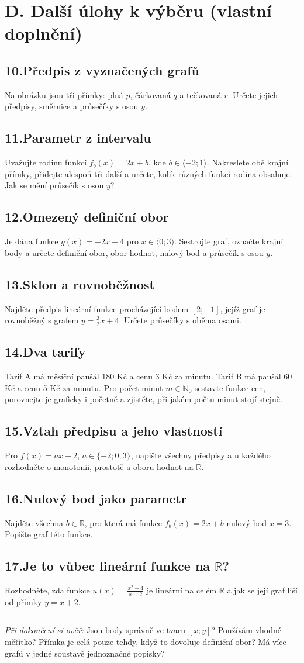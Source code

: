 \documentclass[11pt,a4paper]{article}
\newcommand{\uloha}[2]{\par\needspace{4\baselineskip}\subsection*{#1\enspace #2}}
\begin{document}
\section*{D. Další úlohy k výběru (vlastní doplnění)}
\uloha{10.}{Předpis z vyznačených grafů}
Na obrázku jsou tři přímky: plná $p$, čárkovaná $q$ a tečkovaná $r$. Určete jejich předpisy, směrnice a průsečíky s osou $y$.
\begin{center}
\end{center}
\uloha{11.}{Parametr z intervalu}
Uvažujte rodinu funkcí $f_b(x)=2x+b$, kde $b\in\langle-2;1\rangle$.
Nakreslete obě krajní přímky, přidejte alespoň tři další a určete, kolik různých funkcí rodina obsahuje. Jak se mění průsečík s osou $y$?
\uloha{12.}{Omezený definiční obor}
Je dána funkce $g(x)=-2x+4$ pro $x\in\langle0;3)$. Sestrojte graf, označte krajní body a určete definiční obor, obor hodnot, nulový bod a průsečík s osou $y$.
\uloha{13.}{Sklon a rovnoběžnost}
Najděte předpis lineární funkce procházející bodem $[2;-1]$, jejíž graf je rovnoběžný s grafem $y=\frac32x+4$. Určete průsečíky s oběma osami.
\uloha{14.}{Dva tarify}
Tarif A má měsíční paušál 180 Kč a cenu 3 Kč za minutu. Tarif B má paušál 60 Kč a cenu 5 Kč za minutu. Pro počet minut $m\in\mathbb N_0$ sestavte funkce cen, porovnejte je graficky i početně a zjistěte, při jakém počtu minut stojí stejně.
\uloha{15.}{Vztah předpisu a jeho vlastností}
Pro $f(x)=ax+2$, $a\in\{-2;0;3\}$, napište všechny předpisy a u každého rozhodněte o monotonii, prostotě a oboru hodnot na $\mathbb R$.
\uloha{16.}{Nulový bod jako parametr}
Najděte všechna $b\in\mathbb R$, pro která má funkce $f_b(x)=2x+b$ nulový bod $x=3$. Popište graf této funkce.
\uloha{17.}{Je to vůbec lineární funkce na $\mathbb R$?}
Rozhodněte, zda funkce $u(x)=\frac{x^2-4}{x-2}$ je lineární na celém $\mathbb R$ a jak se její graf liší od přímky $y=x+2$.
\par\vspace{4mm}\hrule\vspace{2mm}
\textit{Při dokončení si ověř:} Jsou body správně ve tvaru $[x;y]$? Používám vhodné měřítko? Přímka je celá pouze tehdy, když to dovoluje definiční obor? Má více grafů v jedné soustavě jednoznačné popisky?
\end{document}
